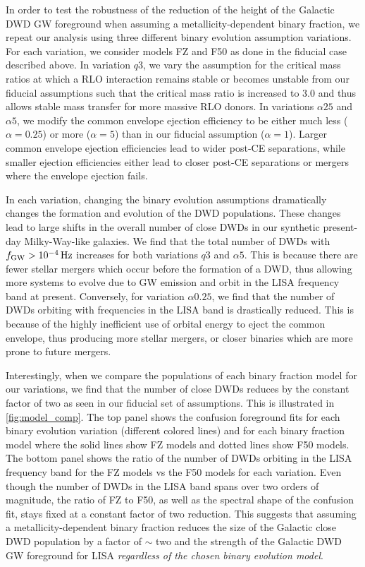 \documentclass[twocolumn]{aastex631}
\begin{document}
In order to test the robustness of the reduction of the height of the Galactic DWD GW foreground when assuming a metallicity-dependent binary fraction, we repeat our analysis using three different binary evolution assumption variations. For each variation, we consider models FZ and F50 as done in the fiducial case described above. In variation $q3$, we vary the assumption for the critical mass ratios at which a RLO interaction remains stable or becomes unstable from our fiducial assumptions such that the critical mass ratio is increased to $3.0$ and thus allows stable mass transfer for more massive RLO donors. In variations $\alpha25$ and $\alpha5$, we modify the common envelope ejection efficiency to be either much less ($\alpha=0.25$) or more ($\alpha=5$) than in our fiducial assumption ($\alpha=1$). Larger common envelope ejection efficiencies lead to wider post-CE separations, while smaller ejection efficiencies either lead to closer post-CE separations or mergers where the envelope ejection fails. 

In each variation, changing the binary evolution assumptions dramatically changes the formation and evolution of the DWD populations. These changes lead to large shifts in the overall number of close DWDs in our synthetic present-day Milky-Way-like galaxies. We find that the total number of DWDs with $f_{\rm{GW}}>10^{-4}\,\rm{Hz}$ increases for both variations $q3$ and $\alpha5$. This is because there are fewer stellar mergers which occur before the formation of a DWD, thus allowing more systems to evolve due to GW emission and orbit in the LISA frequency band at present. Conversely, for variation $\alpha0.25$, we find that the number of DWDs orbiting with frequencies in the LISA band is drastically reduced. This is because of the highly inefficient use of orbital energy to eject the common envelope, thus producing more stellar mergers, or closer binaries which are more prone to future mergers.

Interestingly, when we compare the populations of each binary fraction model for our variations, we find that the number of close DWDs reduces by the constant factor of two as seen in our fiducial set of assumptions. This is illustrated in \ref{fig:model_comp}. The top panel shows the confusion foreground fits for each binary evolution variation (different colored lines) and for each binary fraction model where the solid lines show FZ models and dotted lines show F50 models. The bottom panel shows the ratio of the number of DWDs orbiting in the LISA frequency band for the FZ models vs the F50 models for each variation. Even though the number of DWDs in the LISA band spans over two orders of magnitude, the ratio of FZ to F50, as well as the spectral shape of the confusion fit, stays fixed at a constant factor of two reduction. This suggests that assuming a metallicity-dependent binary fraction reduces the size of the Galactic close DWD population by a factor of $\sim$ two and the strength of the Galactic DWD GW foreground for LISA \emph{regardless of the chosen binary evolution model}.
\end{document}
